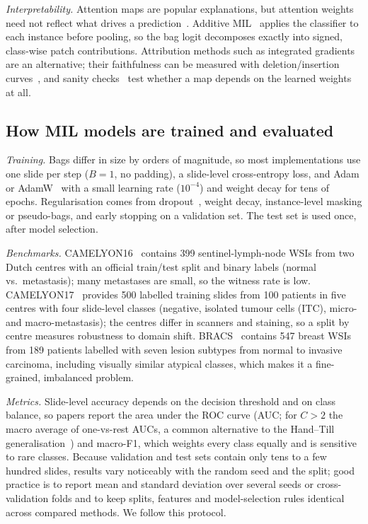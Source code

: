 \documentclass[conference]{IEEEtran}
\begin{document}
\emph{Interpretability.} Attention maps are popular explanations, but attention weights need not reflect what drives a prediction~\cite{jain2019attention,wiegreffe2019attention}. Additive MIL~\cite{javed2022additive} applies the classifier to each instance before pooling, so the bag logit decomposes exactly into signed, class-wise patch contributions. Attribution methods such as integrated gradients~\cite{sundararajan2017ig} are an alternative; their faithfulness can be measured with deletion/insertion curves~\cite{samek2017evaluating,petsiuk2018rise}, and sanity checks~\cite{adebayo2018sanity} test whether a map depends on the learned weights at all.

\subsection{How MIL models are trained and evaluated}
\emph{Training.} Bags differ in size by orders of magnitude, so most implementations use one slide per step ($B{=}1$, no padding), a slide-level cross-entropy loss, and Adam or AdamW~\cite{loshchilov2019adamw} with a small learning rate ($10^{-4}$) and weight decay for tens of epochs. Regularisation comes from dropout~\cite{srivastava2014dropout}, weight decay, instance-level masking or pseudo-bags, and early stopping on a validation set. The test set is used once, after model selection.

\emph{Benchmarks.} CAMELYON16~\cite{bejnordi2017camelyon16} contains 399 sentinel-lymph-node WSIs from two Dutch centres with an official train/test split and binary labels (normal vs.\ metastasis); many metastases are small, so the witness rate is low. CAMELYON17~\cite{bandi2019camelyon17} provides 500 labelled training slides from 100 patients in five centres with four slide-level classes (negative, isolated tumour cells (ITC), micro- and macro-metastasis); the centres differ in scanners and staining, so a split by centre measures robustness to domain shift. BRACS~\cite{brancati2022bracs} contains 547 breast WSIs from 189 patients labelled with seven lesion subtypes from normal to invasive carcinoma, including visually similar atypical classes, which makes it a fine-grained, imbalanced problem.

\emph{Metrics.} Slide-level accuracy depends on the decision threshold and on class balance, so papers report the area under the ROC curve (AUC; for $C>2$ the macro average of one-vs-rest AUCs, a common alternative to the Hand--Till generalisation~\cite{hand2001auc}) and macro-F1, which weights every class equally and is sensitive to rare classes. Because validation and test sets contain only tens to a few hundred slides, results vary noticeably with the random seed and the split; good practice is to report mean and standard deviation over several seeds or cross-validation folds and to keep splits, features and model-selection rules identical across compared methods. We follow this protocol.
\end{document}
